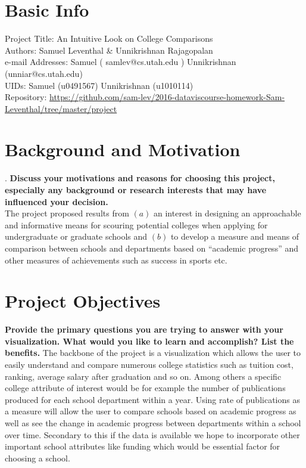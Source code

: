 \documentclass[11pt, a4paper]{article}
\begin{document}
\fi

\section{Basic Info}
Project Title: An Intuitive Look on College Comparisons\\
Authors: Samuel Leventhal \& Unnikrishnan Rajagopalan\\
e-mail Addresses: Samuel ( samlev@cs.utah.edu ) Unnikrishnan (unniar@cs.utah.edu)\\
UIDs: Samuel (u0491567) Unnikrishnan (u1010114)\\
Repository: \href{https://github.com/sam-lev/2016-dataviscourse-homework-Sam-Leventhal/tree/master/project}{https://github.com/sam-lev/2016-dataviscourse-homework-Sam-Leventhal/tree/master/project}

\section{Background and Motivation}.\textbf{ Discuss your motivations and reasons for choosing this project, especially any background or research interests that may have influenced your decision.}\\
The project proposed results from $(a)$ an interest in designing an approachable and informative means for scouring potential colleges when applying for undergraduate or graduate schools and $(b)$ to develop a measure and means of comparison between schools and departments based on ``academic progress'' and other measures of achievements such as success in sports etc. 

\section{Project Objectives}\textbf{ Provide the primary questions you are trying to answer with your visualization. What would you like to learn and accomplish? List the benefits.}
The backbone of the project is a visualization which allows the user to easily understand and compare numerous college statistics such as tuition cost, ranking, average salary after graduation and so on. Among others a specific college attribute of interest would be for example the number of publications produced for each school department within a year. Using rate of publications as a measure will allow the user to compare schools based on academic progress as well as see the change in academic progress between departments within a school over time. Secondary to this if the data is available we hope to incorporate other important school attributes like funding which would be essential factor for choosing a school.
\end{document}

